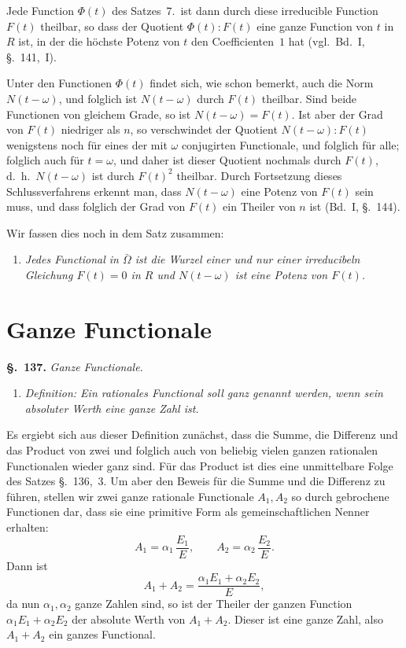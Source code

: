 \documentclass[12pt,a4paper]{article}
\theoremstyle{definition}
\begin{document}
Jede Function $\Phi(t)$ des Satzes~7.\ ist dann durch diese irreducible Function $F(t)$ theilbar, so dass der Quotient $\Phi(t):F(t)$ eine ganze Function von $t$ in $R$ ist, in der die höchste Potenz von $t$ den Coefficienten~$1$ hat (vgl.\ Bd.~I, \S.~141,~I).

Unter den Functionen $\Phi(t)$ findet sich, wie schon bemerkt, auch die Norm $N(t-\omega)$, und folglich ist $N(t-\omega)$ durch $F(t)$ theilbar. Sind beide Functionen von gleichem Grade, so ist $N(t-\omega)=F(t)$. Ist aber der Grad von $F(t)$ niedriger als $n$, so verschwindet der Quotient $N(t-\omega):F(t)$ wenigstens noch für eines der mit $\omega$ conjugirten Functionale, und folglich für alle; folglich auch für $t=\omega$, und daher ist dieser Quotient nochmals durch $F(t)$, d.~h.\ $N(t-\omega)$ ist durch $F(t)^2$ theilbar. Durch Fortsetzung dieses Schlussverfahrens erkennt man, dass $N(t-\omega)$ eine Potenz von $F(t)$ sein muss, und dass folglich der Grad von $F(t)$ ein Theiler von $n$ ist (Bd.~I, \S.~144).

Wir fassen dies noch in dem Satz zusammen:

\begin{enumerate}[label=\arabic*., resume]
\item \textit{Jedes Functional in $\bar{\Omega}$ ist die Wurzel einer und nur einer irreducibeln Gleichung $F(t)=0$ in $R$ und $N(t-\omega)$ ist eine Potenz von $F(t)$.}
\end{enumerate}

\newpage
\section{Ganze Functionale}\label{sec:137}

\noindent\textbf{\S.~137.}\quad
\textit{Ganze Functionale.}\par\medskip

\begin{enumerate}[label=\arabic*.]
\item \textit{Definition: Ein rationales Functional soll \emph{ganz} genannt werden, wenn sein absoluter Werth eine ganze Zahl ist.}
\end{enumerate}

Es ergiebt sich aus dieser Definition zunächst, dass die Summe, die Differenz und das Product von zwei und folglich auch von beliebig vielen ganzen rationalen Functionalen wieder ganz sind. Für das Product ist dies eine unmittelbare Folge des Satzes \S.~136,~3. Um aber den Beweis für die Summe und die Differenz zu führen, stellen wir zwei ganze rationale Functionale $A_1,A_2$ so durch gebrochene Functionen dar, dass sie eine primitive Form als gemeinschaftlichen Nenner erhalten:
\[
A_1 = \alpha_1\,\frac{E_1}{E},\qquad A_2 = \alpha_2\,\frac{E_2}{E}.
\]
Dann ist
\[
A_1 + A_2 = \frac{\alpha_1E_1 + \alpha_2E_2}{E},
\]
da nun $\alpha_1,\alpha_2$ ganze Zahlen sind, so ist der Theiler der ganzen Function $\alpha_1E_1+\alpha_2E_2$ der absolute Werth von $A_1+A_2$. Dieser ist eine ganze Zahl, also $A_1+A_2$ ein ganzes Functional.
\end{document}
